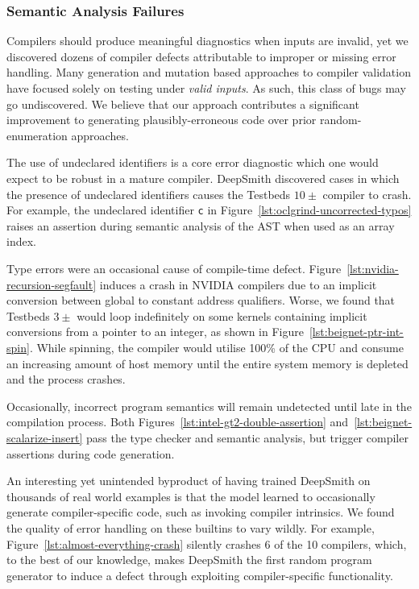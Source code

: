 \subsubsection{Semantic Analysis Failures}

Compilers should produce meaningful diagnostics when inputs are invalid, yet we discovered dozens of compiler defects attributable to improper or missing error handling. Many generation and mutation based approaches to compiler validation have focused solely on testing under \emph{valid inputs}. As such, this class of bugs may go undiscovered. We believe that our approach contributes a significant improvement to generating plausibly-erroneous code over prior random-enumeration approaches.

The use of undeclared identifiers is a core error diagnostic which one would expect to be robust in a mature compiler. DeepSmith discovered cases in which the presence of undeclared identifiers causes the Testbeds $10\pm$ compiler to crash. For example, the undeclared identifier \texttt{c} in Figure~\ref{lst:oclgrind-uncorrected-typos} raises an assertion during semantic analysis of the AST when used as an array index.

Type errors were an occasional cause of compile-time defect. Figure~\ref{lst:nvidia-recursion-segfault} induces a crash in NVIDIA compilers due to an implicit conversion between global to constant address qualifiers. Worse, we found that Testbeds $3\pm$ would loop indefinitely on some kernels containing implicit conversions from a pointer to an integer, as shown in Figure~\ref{lst:beignet-ptr-int-spin}. While spinning, the compiler would utilise 100\% of the CPU and consume an increasing amount of host memory until the entire system memory is depleted and the process crashes.

Occasionally, incorrect program semantics will remain undetected until late in the compilation process. Both Figures~\ref{lst:intel-gt2-double-assertion} and~\ref{lst:beignet-scalarize-insert} pass the type checker and semantic analysis, but trigger compiler assertions during code generation.

An interesting yet unintended byproduct of having trained DeepSmith on thousands of real world examples is that the model learned to occasionally generate compiler-specific code, such as invoking compiler intrinsics. We found the quality of error handling on these builtins to vary wildly. For example, Figure~\ref{lst:almost-everything-crash} silently crashes 6 of the 10 compilers, which, to the best of our knowledge, makes DeepSmith the first random program generator to induce a defect through exploiting compiler-specific functionality.

